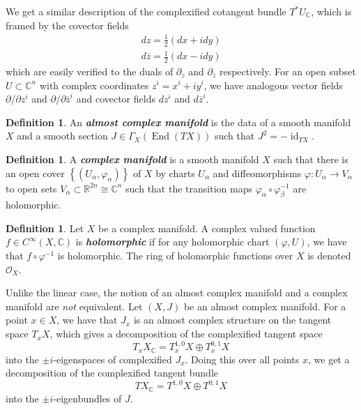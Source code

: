 \documentclass[psamsfonts, 12pt]{amsart}
\theoremstyle{definition}
\newtheorem{defn}[thm]{Definition}
\theoremstyle{remark}
\renewcommand{\O}{\mathscr{O}}
\newcommand{\R}{\mathbb{R}}
\newcommand{\ib}[1]{\textbf{\textit{#1}}}
\newcommand{\C}{\mathbb{C}}
\newcommand{\inv}{^{-1}}
\newcommand{\set}[1]{\left\lbrace #1 \right\rbrace}
\DeclareMathOperator{\id}{id}
\DeclareMathOperator{\End}{End}
\begin{document}
We get a similar description of the complexified cotangent bundle $T^*U_\C$, which
is framed by the covector fields
%
\begin{align*}
dz = \frac{1}{2}\left(dx + idy\right) \\
d\overline{z} = \frac{1}{2}\left( dx -idy\right)
\end{align*}
%
which are easily verified to the duals of $\partial_z$ and $\partial_{\overline{z}}$
respectively. For an open subset $U \subset \C^n$ with complex coordinates
$z^i = x^i +iy^i$, we have analogous vector fields $\partial/\partial z^i$ and
$\partial/\partial\overline{z}^i$ and covector fields $dz^i$ and $d\overline{z}^i$.
%
\begin{defn}
An \ib{almost complex manifold} is the data of a smooth manifold $X$ and a smooth
section $J \in \Gamma_X(\End(TX))$ such that $J^2 = -\id_{TX}$.
\end{defn}
%
\begin{defn}
A \ib{complex manifold} is a smooth manifold $X$ such that there is an open cover
$\set{(U_\alpha, \varphi_\alpha)}$ of $X$ by charts $U_\alpha$ and diffeomorphisms
$\varphi: U_\alpha \to V_\alpha$ to open sets $V_\alpha \subset \R^{2n} \cong \C^n$
such that the transition maps $\varphi_\alpha \circ \varphi_\beta\inv$ are holomorphic.
\end{defn}
%
\begin{defn}
Let $X$ be a complex manifold. A complex valued function $f \in C^\infty(X,\C)$ is
\ib{holomorphic} if for any holomorphic chart $(\varphi, U)$, we have that
$f \circ \varphi\inv$ is holomorphic. The ring of holomorphic functions over $X$ is
denoted $\O_X$.
\end{defn}
%
Unlike the linear case, the notion of an almost complex manifold and a complex manifold
are \emph{not} equivalent. Let $(X,J)$ be an almost complex manifold. For a point
$x \in X$, we have that $J_x$ is an almost complex structure on the tangent space
$T_xX$, which gives a decomposition of the complexified tangent space
\[
T_xX_\C = T_x^{1,0}X \oplus T_x^{0,1}X
\]
into the $\pm i$-eigenspaces of complexified $J_x$. Doing this over all points $x$,
we get a decomposition of the complexified tangent bundle
\[
TX_\C = T^{1,0}X \oplus T^{0,1}X
\]
into the $\pm i$-eigenbundles of $J$.\\
\end{document}
